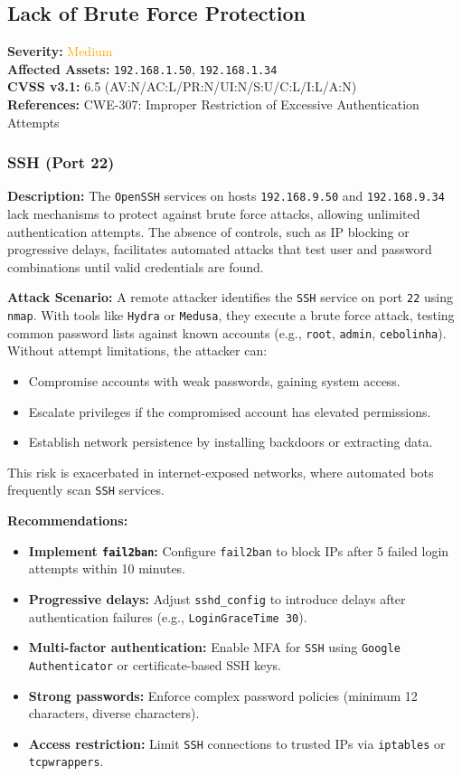 \documentclass[a4paper,12pt]{article}
\begin{document}
\clearpage

\subsection{Lack of Brute Force Protection}
\textbf{Severity:} \textcolor{Orange}{Medium} \\
\textbf{Affected Assets:} \texttt{192.168.1.50}, \texttt{192.168.1.34} \\
\textbf{CVSS v3.1:} 6.5 (AV:N/AC:L/PR:N/UI:N/S:U/C:L/I:L/A:N) \\
\textbf{References:} CWE-307: Improper Restriction of Excessive Authentication Attempts

\subsubsection{SSH (Port 22)}
\textbf{Description:}  
The \texttt{OpenSSH} services on hosts \texttt{192.168.9.50} and \texttt{192.168.9.34} lack mechanisms to protect against brute force attacks, allowing unlimited authentication attempts. The absence of controls, such as IP blocking or progressive delays, facilitates automated attacks that test user and password combinations until valid credentials are found.

\textbf{Attack Scenario:}  
A remote attacker identifies the \texttt{SSH} service on port \texttt{22} using \texttt{nmap}. With tools like \texttt{Hydra} or \texttt{Medusa}, they execute a brute force attack, testing common password lists against known accounts (e.g., \texttt{root}, \texttt{admin}, \texttt{cebolinha}). Without attempt limitations, the attacker can:  
\begin{itemize}
    \item Compromise accounts with weak passwords, gaining system access.  
    \item Escalate privileges if the compromised account has elevated permissions.  
    \item Establish network persistence by installing backdoors or extracting data.  
\end{itemize}
This risk is exacerbated in internet-exposed networks, where automated bots frequently scan \texttt{SSH} services.

\textbf{Recommendations:}  
\begin{itemize}
    \item \textbf{Implement \texttt{fail2ban}:} Configure \texttt{fail2ban} to block IPs after 5 failed login attempts within 10 minutes.  
    \item \textbf{Progressive delays:} Adjust \texttt{sshd\_config} to introduce delays after authentication failures (e.g., \texttt{LoginGraceTime 30}).  
    \item \textbf{Multi-factor authentication:} Enable MFA for \texttt{SSH} using \texttt{Google Authenticator} or certificate-based SSH keys.  
    \item \textbf{Strong passwords:} Enforce complex password policies (minimum 12 characters, diverse characters).  
    \item \textbf{Access restriction:} Limit \texttt{SSH} connections to trusted IPs via \texttt{iptables} or \texttt{tcpwrappers}.  
\end{itemize}
\end{document}
